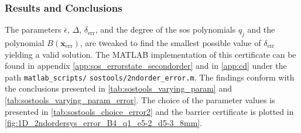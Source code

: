 
\subsubsection{Results and Conclusions}

\vspace{-2mm}
The parameters $\bar{\epsilon}$, $\Delta$, $\delta_\text{err}$, and the degree of the \gls{sos} polynomials $q_j$ and the polynomial $B(\mathbf{x}_\text{err})$, are tweaked to find the smallest possible value of $\delta_\text{err}$ yielding a valid solution.
The MATLAB implementation of this certificate can be found in appendix \ref{app:sos_errorstate_secondorder} and in \autoref{app:cd} under the path \texttt{matlab\_scripts/} \texttt{sostools/}\texttt{2ndorder\_error.m}.
The findings conform with the conclusions presented in \autoref{tab:sostools_varying_param} and \autoref{tab:sostools_varying_param_error}. The choice of the parameter values is presented in \autoref{tab:sostools_choice_error2} and the  barrier certificate is plotted in \autoref{fig:1D_2ndordersys_error_B4_q1_e5-2_d5-3_8mm}.



